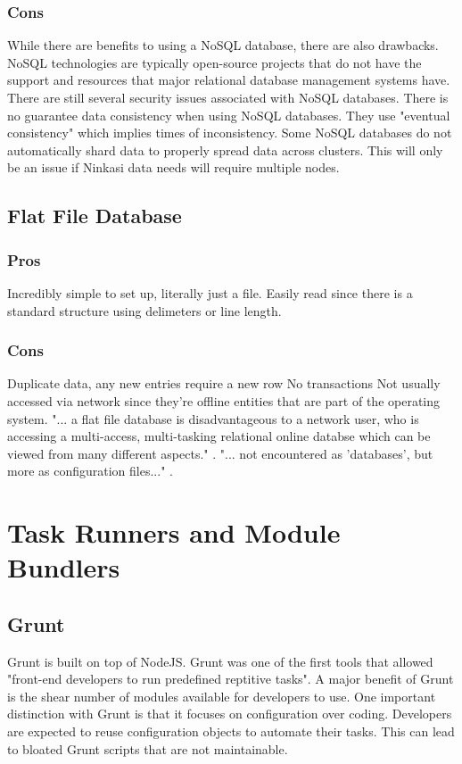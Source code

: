 \documentclass[draftclsnofoot,onecolumn,letterpaper,10pt,compsoc]{IEEEtran}
\begin{document}
    
        \subsubsection{Cons}
            While there are benefits to using a NoSQL database, there are also drawbacks.
            NoSQL technologies are typically open-source projects that do not have the support and resources that major relational database management systems have\cite{NoSQLProsCons}.
            There are still several security issues associated with NoSQL databases\cite{NoSQLSecurityIssues}.
            There is no guarantee data consistency when using NoSQL databases\cite{ChannelFutures}.
            They use "eventual consistency" which implies times of inconsistency.
            Some NoSQL databases do not automatically shard data to properly spread data across clusters\cite{ChannelFutures}.
            This will only be an issue if Ninkasi data needs will require multiple nodes.
        
        
	\subsection{Flat File Database}
        \subsubsection{Pros}
            Incredibly simple to set up, literally just a file.
            Easily read since there is a standard structure using delimeters or line length.
    
        \subsubsection{Cons}
            Duplicate data, any new entries require a new row
            No transactions
            Not usually accessed via network since they're offline entities that are part of the operating system\cite{Techwalla}.
            "... a flat file database is disadvantageous to a network user, who is accessing a multi-access, multi-tasking relational online databse which can be viewed from many different aspects." \cite{Techwalla}.
            "... not encountered as 'databases', but more as configuration files..." \cite{Techwalla}.


\section{Task Runners and Module Bundlers}
	\subsection{Grunt}
        Grunt is built on top of NodeJS. 
        Grunt was one of the first tools that allowed "front-end developers to run predefined reptitive tasks"\cite{TaskRunners}. 
        A major benefit of Grunt is the shear number of modules available for developers to use. 
        One important distinction with Grunt is that it focuses on configuration over coding. 
        Developers are expected to reuse configuration objects to automate their tasks. 
        This can lead to bloated Grunt scripts that are not maintainable\cite{TaskRunners}.
    
\end{document}
